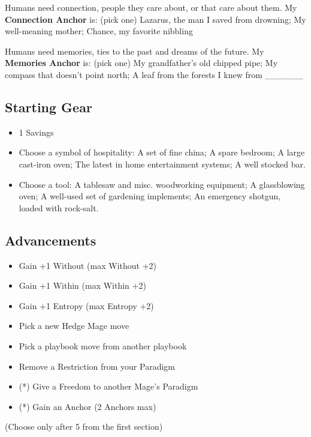 \documentclass[
  oneside,
  statementpaper,
  9pt]{memoir}
\begin{document}
Humans need connection, people they care about, or that care about them.
My \textbf{Connection Anchor} is: (pick one) Lazarus, the man I saved
from drowning; My well-meaning mother; Chance, my favorite nibbling

Humans need memories, ties to the past and dreams of the future. My
\textbf{Memories Anchor} is: (pick one) My grandfather's old chipped
pipe; My compass that doesn't point north; A leaf from the forests I
knew from \_\_\_\_\_\_

\hypertarget{starting-gear-1}{%
\subsection{Starting Gear}\label{starting-gear-1}}

\begin{itemize}
\tightlist
\item
  1 Savings
\item
  Choose a symbol of hospitality: A set of fine china; A spare bedroom;
  A large cast-iron oven; The latest in home entertainment systems; A
  well stocked bar.
\item
  Choose a tool: A tablesaw and misc. woodworking equipment; A
  glassblowing oven; A well-used set of gardening implements; An
  emergency shotgun, loaded with rock-salt.
\end{itemize}

\hypertarget{advancements-1}{%
\subsection{Advancements}\label{advancements-1}}

\begin{itemize}
\tightlist
\item
  Gain +1 Without (max Without +2)
\item
  Gain +1 Within (max Within +2)
\item
  Gain +1 Entropy (max Entropy +2)
\item
  Pick a new Hedge Mage move
\item
  Pick a playbook move from another playbook
\item
  Remove a Restriction from your Paradigm
\item
  (*) Give a Freedom to another Mage's Paradigm
\item
  (*) Gain an Anchor (2 Anchors max)
\end{itemize}

(Choose only after 5 from the first section)
\end{document}
